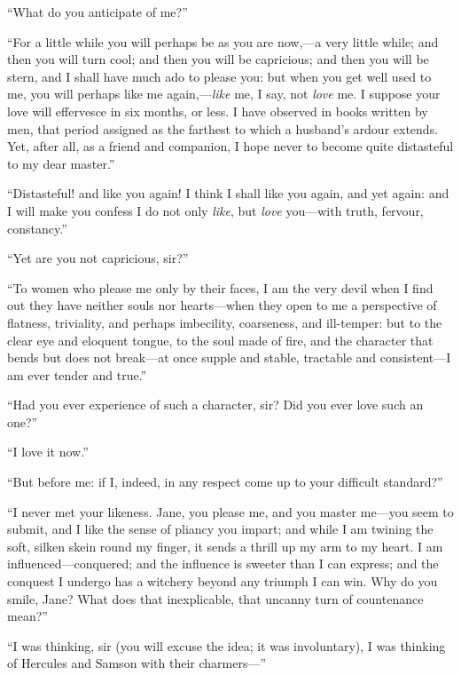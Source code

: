 \enquote{What do you anticipate of me?}

\enquote{For a little while you will perhaps be as you are now,---a very little
	while; and then you will turn cool; and then you will be capricious; and
	then you will be stern, and I shall have much ado to please you: but
	when you get well used to me, you will perhaps like me
	again,---\emph{like} me, I say, not \emph{love} me.  I suppose your love
	will effervesce in six months, or less.  I have observed in books
	written by men, that period assigned as the farthest to which a
	husband's ardour extends.  Yet, after all, as a friend and companion, I
	hope never to become quite distasteful to my dear master.}

\enquote{Distasteful! and like you again!  I think I shall like you again, and
	yet again: and I will make you confess I do not only \emph{like}, but
	\emph{love} you---with truth, fervour, constancy.}

\enquote{Yet are you not capricious, sir?}

\enquote{To women who please me only by their faces, I am the very devil
	when I find out they have neither souls nor hearts---when they open to
	me a perspective of flatness, triviality, and perhaps imbecility,
	coarseness, and ill-temper: but to the clear eye and eloquent tongue, to
	the soul made of fire, and the character that bends but does not
	break---at once supple and stable, tractable and consistent---I am ever
	tender and true.}

\enquote{Had you ever experience of such a character, sir?  Did you ever
	love such an one?}

\enquote{I love it now.}

\enquote{But before me: if I, indeed, in any respect come up to your
	difficult standard?}

\enquote{I never met your likeness.  Jane, you please me, and you master
	me---you seem to submit, and I like the sense of pliancy you impart; and
	while I am twining the soft, silken skein round my finger, it sends a
	thrill up my arm to my heart.  I am influenced---conquered; and the
	influence is sweeter than I can express; and the conquest I undergo has
	a witchery beyond any triumph I can win.  Why do you smile, Jane?  What
	does that inexplicable, that uncanny turn of countenance mean?}

\enquote{I was thinking, sir (you will excuse the idea; it was
	involuntary), I was thinking of Hercules and Samson with their
	charmers---}

